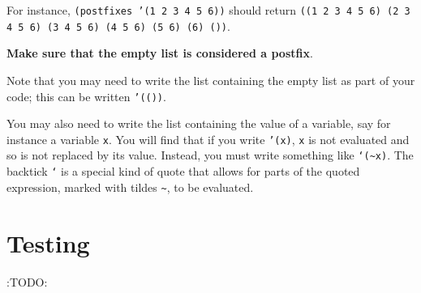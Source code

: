 \documentclass[11pt]{article}
\begin{document}
For instance, \texttt{(postfixes '(1 2 3 4 5 6))} should
return \texttt{((1 2 3 4 5 6) (2 3 4 5 6) (3 4 5 6) (4 5 6) (5 6) (6) ())}.

\textbf{Make sure that the empty list is considered a postfix}.

Note that you may need to write the list containing the empty list
as part of your code; this can be written \texttt{'(())}.

You may also need to write the list containing the value of a variable,
say for instance a variable \texttt{x}. You will find that
if you write \texttt{'(x)}, \texttt{x} is not evaluated and so is not replaced by its value.
Instead, you must write something like \texttt{`(\textasciitilde{}x)}. The backtick \texttt{`} is a special
kind of quote that allows for parts of the quoted expression,
marked with tildes \texttt{\textasciitilde{}}, to be evaluated.

\section*{Testing}
\label{sec:org19b3a1d}
:TODO:
\end{document}
